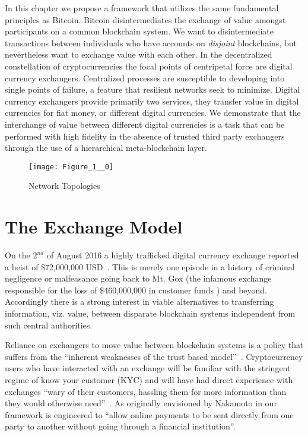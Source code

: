 In this chapter we propose a framework that utilizes the same fundamental principles as Bitcoin.
Bitcoin disintermediates the exchange of value amongst participants on a common blockchain system.
We want to disintermediate transactions between individuals who have accounts on \textit{disjoint} blockchains, but nevertheless want to exchange value with each other. 
In the decentralized constellation of cryptocurrencies the focal points of centripetal force are digital currency exchangers. 
Centralized processes are susceptible to developing into single points of failure, a feature that resilient networks seek to minimize.
Digital currency exchangers provide primarily two services, they transfer value in digital currencies for fiat money, or different digital currencies.
We demonstrate that the interchange of value between different digital currencies is a task that can be performed with high fidelity in the absence of trusted third party exchangers through the use of a hierarchical meta-blockchain layer. 

\begin{figure}
\centering
\texttt{[image: Figure\_1\_\_0]}
\caption{Network Topologies}
\end{figure}

\section{The Exchange Model}

On the $2^{nd}$ of August 2016 a highly trafficked digital currency exchange reported a heist of \$72,000,000 USD~\cite{baldwin_2016}. 
This is merely one episode in a history of criminal negligence or malfeasance going back to Mt. Gox (the infamous exchange responsible for the loss of \$460,000,000 in customer funds \cite{wire}) and beyond. 
Accordingly there is a strong interest in viable alternatives to transferring information, viz. value, between disparate blockchain systems independent from such central authorities.

Reliance on exchangers to move value between blockchain systems is a policy that suffers from the \enquote{inherent weaknesses of the trust based model}~\cite{satoshi2008bitcoin}.
Cryptocurrency users who have interacted with an exchange will be familiar with the stringent regime of know your customer (KYC) and will have had direct experience with exchanges \enquote{wary of their customers, hassling them for more information than they would otherwise need}~\cite{satoshi2008bitcoin}. 
As originally envisioned by Nakamoto in \cite{satoshi2008bitcoin} our framework is engineered to \enquote{allow online payments to be sent directly from one party to another without going through a financial institution}.

